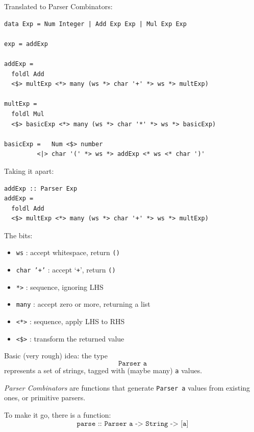 \documentclass{beamer}
\begin{document}
\begin{frame}[containsverbatim]
  Translated to Parser Combinators:

\begin{verbatim}
data Exp = Num Integer | Add Exp Exp | Mul Exp Exp

exp = addExp

addExp =
  foldl Add
  <$> multExp <*> many (ws *> char '+' *> ws *> multExp)

multExp =
  foldl Mul
  <$> basicExp <*> many (ws *> char '*' *> ws *> basicExp)

basicExp =   Num <$> number
         <|> char '(' *> ws *> addExp <* ws <* char ')'
\end{verbatim}
\end{frame}

\begin{frame}[containsverbatim]
  Taking it apart:
\begin{verbatim}
addExp :: Parser Exp
addExp =
  foldl Add
  <$> multExp <*> many (ws *> char '+' *> ws *> multExp)
\end{verbatim}
  
  The bits:
  \begin{itemize}
  \item \texttt{ws} : accept whitespace, return \texttt{()}
  \item \texttt{char '+'} : accept `\texttt{+}', return \texttt{()}
  \item \texttt{*>} : sequence, ignoring LHS
  \item \texttt{many} : accept zero or more, returning a list
  \item \texttt{<*>} : sequence, apply LHS to RHS
  \item \texttt{<\$>} : transform the returned value
  \end{itemize}
\end{frame}

\begin{frame}
  Basic (very rough) idea: the type
  \begin{displaymath}
    \texttt{Parser a}
  \end{displaymath}
  represents a set of strings, tagged with (maybe many) \texttt{a} values.

  \bigskip

  \emph{Parser Combinators} are functions that generate \texttt{Parser
    a} values from existing ones, or primitive parsers.

  \bigskip

  To make it go, there is a function:
  \begin{displaymath}
    \texttt{parse :: Parser a -> String -> [a]}
  \end{displaymath}
\end{frame}
\end{document}
